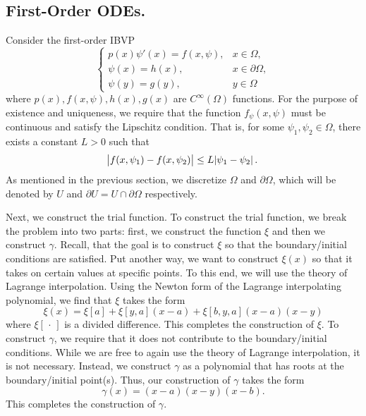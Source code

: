 \documentclass[10pt]{article}
\theoremstyle{plain}
\theoremstyle{definition}
\theoremstyle{remark}
\numberwithin{theorem}{section}
\numberwithin{proposition}{section}
\numberwithin{remark}{section}
\numberwithin{corollary}{section}
\numberwithin{definition}{section}
\numberwithin{lemma}{section}
\numberwithin{equation}{section}
\begin{document}
\subsection{First-Order ODEs.}
Consider the first-order IBVP 
\begin{equation}
	\label{first-order ODEs, IBVP}
	\displaystyle \begin{cases}
		p(x)\psi'(x) = f(x,\psi), & x \in \Omega, \\
		\psi(x) = h(x), & x \in \partial \Omega, \\
		\psi(y) = g(y), & y \in \Omega 
	\end{cases}
\end{equation}
where $p(x), f(x, \psi), h(x), g(x)$ are $C^\infty(\Omega)$ functions. For the purpose of existence and uniqueness, we require that the function $f_\psi(x,\psi)$ must be continuous and satisfy the Lipschitz condition. That is, for some $\psi_1, \psi_2 \in \Omega$, there exists a constant $L > 0$ such that 
\begin{equation*}
	\displaystyle \abs{f(x,\psi_1) - f(x,\psi_2)} \leq L \abs{\psi_1 - \psi_2}.
\end{equation*}
As mentioned in the previous section, we discretize $\Omega$ and $\partial \Omega$, which will be denoted by $U$ and $\partial U = U \cap \partial \Omega$ respectively.

Next, we construct the trial function. To construct the trial function, we break the problem into two parts: first, we construct the function $\xi$ and then we construct $\gamma$. Recall, that the goal is to construct $\xi$ so that the boundary/initial conditions are satisfied. Put another way, we want to construct $\xi(x)$ so that it takes on certain values at specific points. To this end, we will use the theory of Lagrange interpolation. Using the Newton form of the Lagrange interpolating polynomial, we find that $\xi$ takes the form 
\begin{equation}
	\label{first-order ODEs, xi}
	\displaystyle \xi(x) = \xi[a] + \xi[y,a](x-a) + \xi[b,y,a](x-a)(x-y)
\end{equation}
where $\xi[\,\cdot\,]$ is a divided difference. This completes the construction of $\xi$. To construct $\gamma$, we require that it does not contribute to the boundary/initial conditions. While we are free to again use the theory of Lagrange interpolation, it is not necessary. Instead, we construct $\gamma$ as a polynomial that has roots at the boundary/initial point(s). Thus, our construction of $\gamma$ takes the form 
\begin{equation}
	\label{first-order ODEs, gamma}
	\displaystyle \gamma(x) = (x-a)(x-y)(x-b).
\end{equation}
This completes the construction of $\gamma$. 
\end{document}
